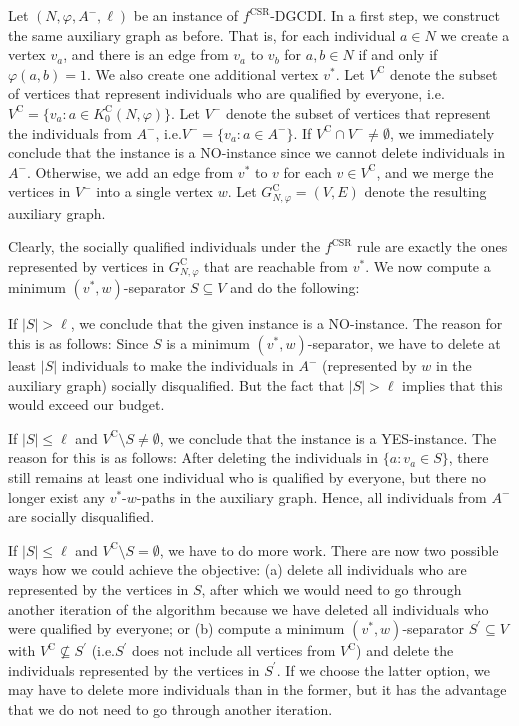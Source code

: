 \documentclass[
    12pt,               %
    a4paper,            %
    bibtotoc,           %
    pointlessnumbers,   %
    ngerman,            %
    titlepage,          %
    leqno,              %
    ]{scrarticle}       %
\begin{document}
\begin{Proof}
Let $(N, \varphi, A^-, \ell)$ be an instance of $f^{\text{CSR}}$-DGCDI. In a first step, we construct the same auxiliary graph as before. That is, for each individual $a \in N$ we create a vertex $v_a$, and there is an edge from $v_a$ to $v_b$ for $a, b \in N$ if and only if $\varphi(a, b) = 1$. We also create one additional vertex $v^\ast$. Let $V^{\text{C}}$ denote the subset of vertices that represent individuals who are qualified by everyone, i.e.\@ $V^{\text{C}} = \{ v_a : a \in K^{\text{C}}_0(N, \varphi) \}$. Let $V^-$ denote the subset of vertices that represent the individuals from $A^-$, i.e.\@ $V^- = \{ v_a : a \in A^- \}$. If $V^{\text{C}} \cap V^- \neq \emptyset$, we immediately conclude that the instance is a NO-instance since we cannot delete individuals in $A^-$. Otherwise, we add an edge from $v^\ast$ to $v$ for each $v \in V^{\text{C}}$, and we merge the vertices in $V^-$ into a single vertex $w$. Let $G_{N, \varphi}^{\text{C}} = (V, E)$ denote the resulting auxiliary graph.

Clearly, the socially qualified individuals under the $f^{\text{CSR}}$ rule are exactly the ones represented by vertices in $G_{N, \varphi}^{\text{C}}$ that are reachable from $v^\ast$. We now compute a minimum $(v^\ast, w)$-separator $S \subseteq V$ and do the following:

If $|S| > \ell$, we conclude that the given instance is a NO-instance. The reason for this is as follows: Since $S$ is a minimum $(v^\ast, w)$-separator, we have to delete at least $|S|$ individuals to make the individuals in $A^-$ (represented by $w$ in the auxiliary graph) socially disqualified. But the fact that $|S| > \ell$ implies that this would exceed our budget.

If $|S| \leq \ell$ and $V^{\text{C}} \setminus S \neq \emptyset$, we conclude that the instance is a YES-instance. The reason for this is as follows: After deleting the individuals in $\{ a : v_a \in S \}$, there still remains at least one individual who is qualified by everyone, but there no longer exist any $v^\ast$-$w$-paths in the auxiliary graph. Hence, all individuals from $A^-$ are socially disqualified.

If $|S| \leq \ell$ and $V^{\text{C}} \setminus S = \emptyset$, we have to do more work. There are now two possible ways how we could achieve the objective: (a) delete all individuals who are represented by the vertices in $S$, after which we would need to go through another iteration of the algorithm because we have deleted all individuals who were qualified by everyone; or (b) compute a minimum $(v^\ast, w)$-separator $S^\prime \subseteq V$ with $V^{\text{C}} \not\subseteq S^\prime$ (i.e.\@ $S^\prime$ does not include all vertices from $V^{\text{C}}$) and delete the individuals represented by the vertices in $S^\prime$. If we choose the latter option, we may have to delete more individuals than in the former, but it has the advantage that we do not need to go through another iteration.


\end{Proof}
\end{document}
